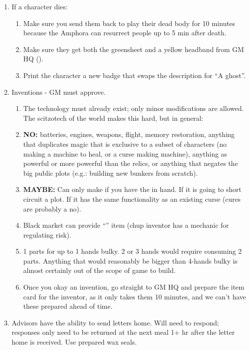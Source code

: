 \documentclass[green]{GL2020}
\begin{document}
\begin{enumerate}
\begin{enumerate}
	\end{enumerate}
	\item If a character dies:
	\begin{enumerate}
		\item Make sure you send them back to play their dead body for 10 minutes because the Amphora can resurrect people up to 5 min after death.
		\item Make sure they get both the greensheet and a yellow headband from GM HQ (\sMurdered{}).
		\item Print the character a new badge that swaps the description for “A ghost”.
	\end{enumerate}
\item Inventions - GM must approve.
	\begin{enumerate}
		\item The technology must already exist; only minor modifications are allowed. The scitzotech of the world makes this hard, but in general:
		\item \textbf{NO:} batteries, engines, weapons, flight, memory restoration, anything that duplicates magic that is exclusive to a subset of characters (no making a machine to heal, or a curse making machine), anything as powerful or more powerful than the relics, or anything that negates the big public plots (e.g.: building new bunkers from scratch).
		\item \textbf{MAYBE:} Can only make \iVidCom{} if you have the \iVCDBlueprint{} in hand. If it is going to short circuit a plot. If it has the same functionality as an existing curse (cures are probably a no).
			\item Black market can provide ``\iMagitechParts{}'' item (chup inventor has a mechanic for regulating risk).
		\item 1 \iMagitechParts{} parts for up to 1 hands bulky. 2 or 3 hands would require consuming 2 \iMagitechParts{} parts. Anything that would reasonably be bigger than 4-hands bulky is almost certainly out of the scope of game to build.
		\item Once you okay an invention, go straight to GM HQ and prepare the item card for the inventor, as it only takes them 10 minutes, and we can't have these prepared ahead of time.
	\end{enumerate}
	\item Advisors have the ability to send letters home. Will need to respond; responses only need to be returned at the next meal 1+ hr after the letter home is received. Use prepared wax seals.
	\begin{enumerate}

\end{enumerate}
\end{enumerate}
\end{document}
